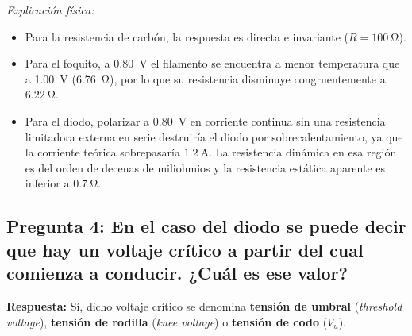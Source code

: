 \begin{appendices}
\begin{table}[H]
    \centering
    \caption{Resistencias estáticas calculadas y deducidas a la tensión normalizada de \qty{0,80}{\volt}.}
    \label{tab:anexo_resp_p3}
\end{table}

\textit{Explicación física:}
\begin{itemize}
    \item Para la resistencia de carbón, la respuesta es directa e invariante ($R = \qty{100}{\ohm}$).
    \item Para el foquito, a \qty{0,80}{\volt} el filamento se encuentra a menor temperatura que a \qty{1,00}{\volt} (\qty{6,76}{\ohm}), por lo que su resistencia disminuye congruentemente a $\qty{6,22}{\ohm}$.
    \item Para el diodo, polarizar a \qty{0,80}{\volt} en corriente continua sin una resistencia limitadora externa en serie destruiría el diodo por sobrecalentamiento, ya que la corriente teórica sobrepasaría $\qty{1,2}{\ampere}$. La resistencia dinámica en esa región es del orden de decenas de miliohmios y la resistencia estática aparente es inferior a $\qty{0,7}{\ohm}$.
\end{itemize}

\subsection{Pregunta 4: En el caso del diodo se puede decir que hay un voltaje crítico a partir del cual comienza a conducir. ¿Cuál es ese valor?}
\textbf{Respuesta:}  
Sí, dicho voltaje crítico se denomina \textbf{tensión de umbral} (\textit{threshold voltage}), \textbf{tensión de rodilla} (\textit{knee voltage}) o \textbf{tensión de codo} ($V_u$).


\end{appendices}
